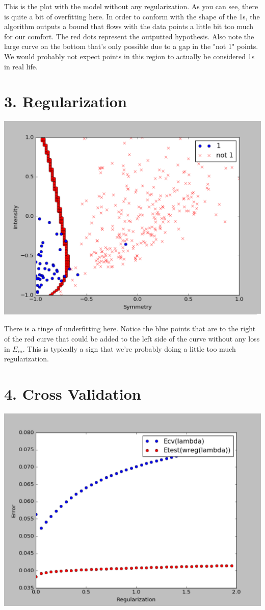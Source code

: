 \documentclass[12pt]{article}
\begin{document}
This is the plot with the model without any regularization. As you can see, there is quite a bit of overfitting here. In order to conform with the shape of the 1s, the algorithm outputs a bound that flows with the data points a little bit too much for our comfort. The red dots represent the outputted hypothesis. Also note the large curve on the bottom that's only possible due to a gap in the "not 1" points. We would probably not expect points in this region to actually be considered 1s in real life.

\section*{3. Regularization}
\includegraphics[scale=.5]{3-1.png}

There is a tinge of underfitting here. Notice the blue points that are to the right of the red curve that could be added to the left side of the curve without any loss in $E_{in}$. This is typically a sign that we're probably doing a little too much regularization.

\section*{4. Cross Validation}
\includegraphics[scale=.5]{4-1.png}
\end{document}

